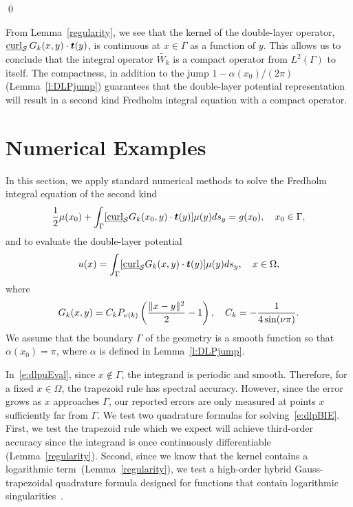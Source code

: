 \qed

From Lemma~\ref{regularity}, we see that the kernel of the double-layer
operator, $\underline{\mbox{curl}}_{\S}\, G_{k}(x,y)\cdot\vec{t}(y)$, is
continuous at $x \in \Gamma$ as a function of $y$.  This allows us to
conclude that the integral operator $\widetilde{W_k}$ is a compact
operator from $L^{2}(\Gamma)$ to itself.  The compactness, in addition
to the jump $1-\alpha(x_0)/(2\pi)$ (Lemma~\ref{l:DLPjump}) guarantees
that the double-layer potential representation will result in a second
kind Fredholm integral equation with a compact operator.

\section{Numerical Examples}
\label{s:numerics}
In this section, we apply standard numerical methods to solve the
Fredholm integral equation of the second kind
\begin{align}
  \label{e:dlpBIE}
  \frac{1}{2}\mu(x_{0}) + \int_{\Gamma}
    [\underline{\mbox{curl}}_{\S}G_{k}(x_{0},y) \cdot
    \vec{t}(y)] \mu(y)ds_{y} = g(x_{0}), \quad x_{0} \in \Gamma,
\end{align}
and to evaluate the double-layer potential
\begin{align}
  \label{e:dlpuEval}
  u(x) = \int_{\Gamma} [\underline{\mbox{curl}}_{\S}G_{k}(x,y) 
    \cdot \vec{t}(y)] \mu(y)ds_{y}, \quad x \in \Omega,
\end{align}
where
\begin{align*}
  G_{k}(x,y) = C_k P_{\nu(k)} \left(
    \frac{\|x - y\|^{2}}{2} - 1\right), \quad 
  C_k=-\frac{1}{4\sin(\nu\pi)}.
\end{align*}
We assume that the boundary $\Gamma$ of the geometry is a smooth
function so that $\alpha(x_{0}) = \pi$, where $\alpha$ is defined in
Lemma~\ref{l:DLPjump}.

In~\eqref{e:dlpuEval}, since $x \notin \Gamma$, the integrand is
periodic and smooth.  Therefore, for a fixed $x\in \Omega$, the
trapezoid rule has spectral accuracy.  However, since the error grows as
$x$ approaches $\Gamma$, our reported errors are only measured at points
$x$ sufficiently far from $\Gamma$.  We test two quadrature formulas for
solving~\eqref{e:dlpBIE}.  First, we test the trapezoid rule which we
expect will achieve third-order accuracy since the integrand is once
continuously differentiable (Lemma~\ref{regularity}).  Second, since we
know that the kernel contains a logarithmic
term~(Lemma~\ref{regularity}), we test a high-order hybrid
Gauss-trapezoidal quadrature formula designed for functions that contain
logarithmic singularities~\cite{alpert}.

